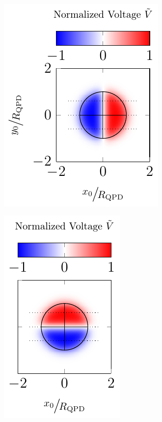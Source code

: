  \begin{figure}
  \centering
  \begin{subfigure}[b]{0.36\textwidth}
    \centering
    \includegraphics[]{External/QPDx.pdf}
    \label{fig:TO-QPDx}
  \end{subfigure}
  \hfill
  \begin{subfigure}[b]{0.3\textwidth}
    \centering
    \includegraphics[]{External/QPDy.pdf}

\end{subfigure}
\end{figure}
